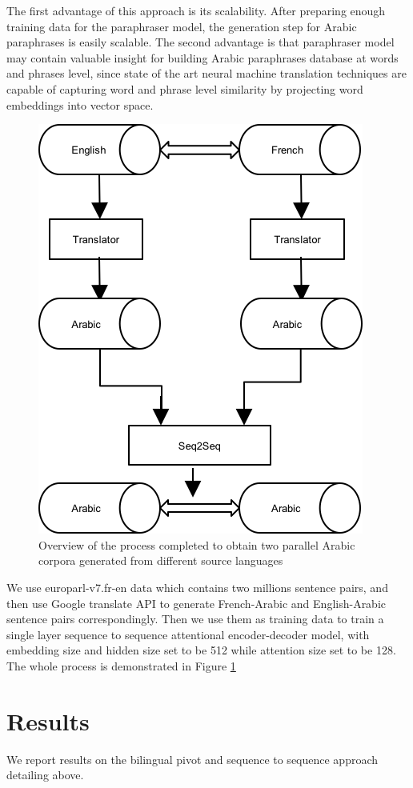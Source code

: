 \documentclass[11pt,letterpaper]{article}
\begin{document}
	The first advantage of this approach is its scalability. After preparing enough training data for the paraphraser model, the generation step for Arabic paraphrases is easily scalable. The second advantage is that paraphraser model may contain valuable insight for  building Arabic paraphrases database at  words and phrases level, since state of the art neural machine translation techniques are capable of capturing word and phrase level similarity by projecting word embeddings into vector space.
\begin{figure}
\includegraphics[scale=1.0]{monolingual}
\caption{Overview of the process completed to obtain two parallel Arabic corpora generated from different source languages}
\label{fig:mono}
\end{figure}

	We use europarl-v7.fr-en data which contains two millions sentence pairs, and then use Google translate API to generate French-Arabic and English-Arabic sentence pairs correspondingly. Then we use them as training data to train a single layer sequence to sequence attentional encoder-decoder model, with embedding size and hidden size set to be 512 while attention size set to be 128. The whole process is demonstrated in Figure  \ref{fig:mono}


\section{Results}
We report results on the bilingual pivot and sequence to sequence approach detailing above. 
\end{document}
